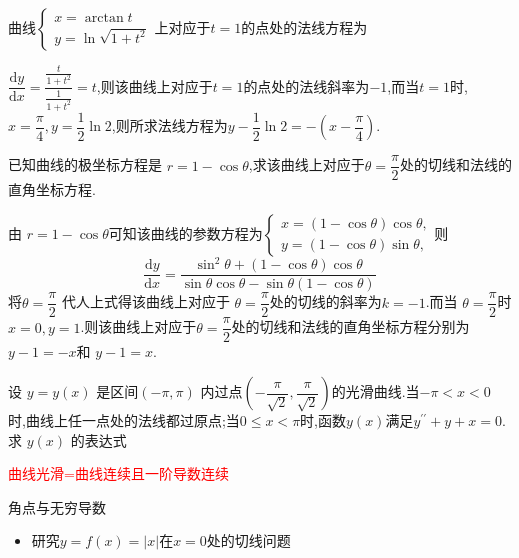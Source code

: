 \documentclass[8pt a4paper, oneside, UTF8]{ctexbook}  %
\begin{document}
\begin{sloppypar}
    \begin{problem}
    曲线$\begin{cases}
            x=\arctan t \\
            y=\ln\sqrt{1+t^2}
        \end{cases}$上对应于$t=1$的点处的法线方程为
    \end{problem}
    \begin{solution}
        $\dfrac{\mathrm{d}y}{\mathrm{d}x}=\dfrac{\frac{t}{1+t^{2}}}{\frac{1}{1+t^{2}}}=t$,则该曲线上对应于$t=1$的点处的法线斜率为$-1$,而当$t=1$时,$x=\dfrac{\pi}{4},y=\dfrac{1}{2}\ln2$,则所求法线方程为$y - \dfrac{1}{2}\ln 2 =-(x-\dfrac{\pi}{4}).$
    \end{solution}
    \begin{problem}
    已知曲线的极坐标方程是 $r=1-\cos\theta$,求该曲线上对应于$\theta=\dfrac\pi2$处的切线和法线的直角坐标方程.
    \end{problem}
    \begin{solution}
        由 $r=1-\cos\theta$可知该曲线的参数方程为$\begin{cases}x=(1-\cos\theta)\cos\theta,\\y=(1-\cos\theta)\sin\theta,\end{cases}$则
        $$
            \dfrac{\mathrm{d}y}{\mathrm{d}x}=\dfrac{\sin^2\theta+(1-\cos\theta)\cos\theta}{\sin\theta\cos\theta-\sin\theta(1-\cos\theta)}
        $$
        将$\theta=\dfrac\pi2$ 代人上式得该曲线上对应于 $\theta=\dfrac\pi2$处的切线的斜率为$k=-1$.而当 $\theta=\dfrac\pi2$时$x=0,y=1$.则该曲线上对应于$\theta=\dfrac\pi2$处的切线和法线的直角坐标方程分别为$y-1=-x$和 $y-1=x$.
    \end{solution}
    \begin{problem}
    设 $y=y(x)$ 是区间$(-\pi,\pi)$ 内过点$\left(-\dfrac\pi{\sqrt{2}},\dfrac\pi{\sqrt{2}}\right)$的光滑曲线.当$-\pi<x<0$ 时,曲线上任一点处的法线都过原点;当$0\leqslant x<\pi$时,函数$y(x)$满足$y^{\prime\prime}+y+x=0.$求 $y(x)$ 的表达式
    \end{problem}
    \begin{solution}
    \end{solution}
    \begin{note}
        \textcolor{red}{曲线光滑=曲线连续且一阶导数连续}
    \end{note}
    \begin{criterion}{角点与无穷导数}{}
        \begin{itemize}
            \item 研究$y=f(x)=|x|$在$x=0$处的切线问题

\end{itemize}
\end{criterion}
\end{sloppypar}
\end{document}
